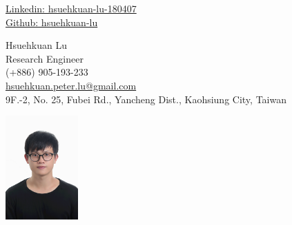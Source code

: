 \begin{center}
	\begin{minipage}[b]{0.24\textwidth}
		{\href{https://www.linkedin.com/in/hsuehkuan-lu-180407/}{Linkedin: hsuehkuan-lu-180407} } \\
		\href{https://github.com/hsuehkuan-lu}{Github: hsuehkuan-lu}
		
	\end{minipage}%
	\begin{minipage}[b]{0.5\textwidth}
		\centering
		{\HUGE Hsuehkuan Lu} \\ %
		\vspace{0.1cm}
		{\color{UI_blue} \Large{Research Engineer}} \\
		\large (+886) 905-193-233 \\
		\large \href{mailto:hsuehkuan.peter.lu@gmail.com}{hsuehkuan.peter.lu@gmail.com} \\
		\small 9F.-2, No. 25, Fubei Rd., Yancheng Dist., Kaohsiung City, Taiwan \\
	\end{minipage}%
	\begin{minipage}[b]{0.24\textwidth}
		\flushright \large  %
		\includegraphics[width=2.8cm, height=4cm]{images/me.jpg}
	\end{minipage}   
	
\end{center}